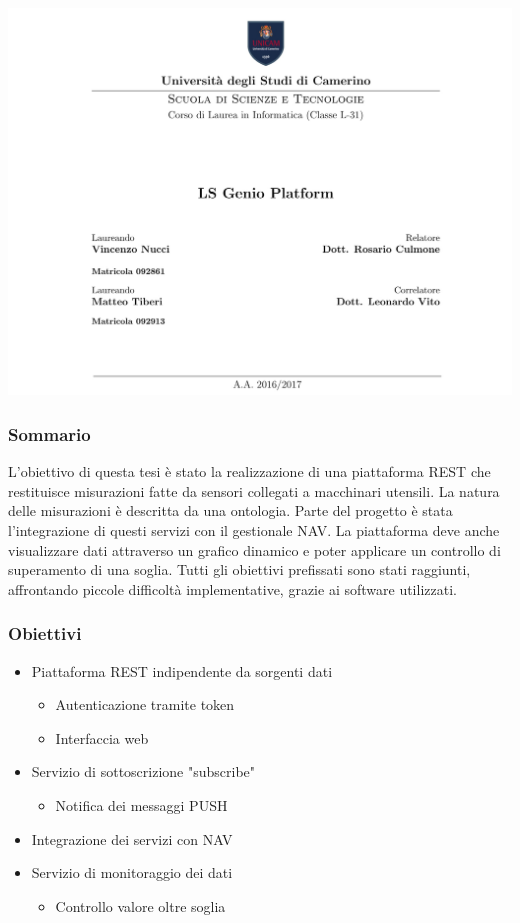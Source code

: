 \documentclass{beamer}
\date{}
\begin{document}
	
	\begin{frame}
	\centering
	\includegraphics[scale=0.25]{images/frontespizio-beamer.png}\par
\end{frame}

\begin{frame}
	\frametitle{Sommario}
	L'obiettivo di questa tesi è stato la realizzazione di una piattaforma REST che restituisce misurazioni fatte da sensori collegati a macchinari utensili. La natura delle misurazioni è descritta da una ontologia. Parte del progetto è stata l'integrazione di questi servizi con il gestionale NAV. La piattaforma deve anche visualizzare dati attraverso un grafico dinamico e poter applicare un controllo di superamento di una soglia. Tutti gli obiettivi prefissati sono stati raggiunti, affrontando piccole difficoltà implementative, grazie ai software utilizzati.
\end{frame}

\begin{frame}
\frametitle{Obiettivi}
\begin{itemize}
	\item Piattaforma REST indipendente da sorgenti dati
	\begin{itemize}
		\item Autenticazione tramite token
		\item Interfaccia web
	\end{itemize}
	\item Servizio di sottoscrizione "subscribe"
	\begin{itemize}
		\item Notifica dei messaggi PUSH
	\end{itemize}
	\item Integrazione dei servizi con NAV
	\item Servizio di monitoraggio dei dati
	\begin{itemize}
		\item Controllo valore oltre soglia
	\end{itemize}
\end{itemize}
\end{frame}
\end{document}
